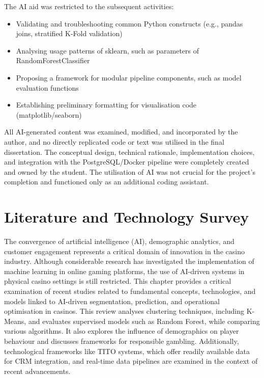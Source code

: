 \documentclass[12pt,a4paper]{report}
\begin{document}
The AI aid was restricted to the subsequent activities:
\begin{itemize}
    \item Validating and troubleshooting common Python constructs (e.g., pandas joins, stratified K-Fold validation)
    \item Analysing usage patterns of sklearn, such as parameters of RandomForestClassifier
    \item Proposing a framework for modular pipeline components, such as model evaluation functions
    \item Establishing preliminary formatting for visualisation code (matplotlib/seaborn)
\end{itemize}

All AI-generated content was examined, modified, and incorporated by the author, and no directly replicated code or text was utilised in the final dissertation. The conceptual design, technical rationale, implementation choices, and integration with the PostgreSQL/Docker pipeline were completely created and owned by the student. The utilisation of AI was not crucial for the project's completion and functioned only as an additional coding assistant.


\chapter{Literature and Technology Survey}

The convergence of artificial intelligence (AI), demographic analytics, and customer engagement represents a critical domain of innovation in the casino industry.  Although considerable research has investigated the implementation of machine learning in online gaming platforms, the use of AI-driven systems in physical casino settings is still restricted.  This chapter provides a critical examination of recent studies related to fundamental concepts, technologies, and models linked to AI-driven segmentation, prediction, and operational optimisation in casinos.   This review analyses clustering techniques, including K-Means, and evaluates supervised models such as Random Forest, while comparing various algorithms. It also explores the influence of demographics on player behaviour and discusses frameworks for responsible gambling. Additionally, technological frameworks like TITO systems, which offer readily available data for CRM integration, and real-time data pipelines are examined in the context of recent advancements.
\end{document}
